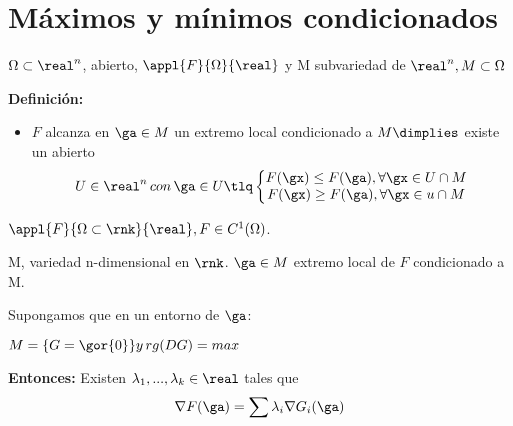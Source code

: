 \section{Máximos y mínimos condicionados}

\begin{defn}
$\Omega\subset\real^n$, abierto, $\appl{F}{\Omega}{\real}$ y M subvariedad de $\real^n, M\subset \Omega$

\textbf{Definición:}

\begin{itemize}
\item $F$ alcanza en $\ga\in M$ un extremo local condicionado a $M \dimplies$ existe un abierto \[U\in\real^n\, con \, \ga\in U \tlq \left\{\begin{matrix} F(\gx) \leq F(\ga), \forall \gx \in U\cap M \\
F(\gx) \geq F(\ga), \forall \gx \in u\cap M \end{matrix}\right.\]
\end{itemize}

\end{defn}


\begin{theorem} \label{thmMultLagrange}
$\appl{F}{\Omega\subset\rnk}{\real}, F\in C^1(\Omega)$.

M, variedad n-dimensional en $\rnk$. $\ga\in M$ extremo local de $F$ condicionado a M.

Supongamos que en un entorno de $\ga$:

$M = \{G = \gor{0}\} y \, rg(DG)=max$

\textbf{Entonces:} Existen $\lambda_1,...,\lambda_k \in \real$ tales que
\[\nabla F(\ga) = \sum \lambda_i \nabla G_i (\ga)\]
\end{theorem}

